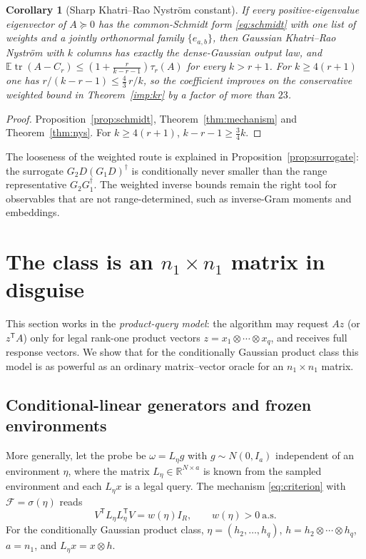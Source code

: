 \documentclass[11pt,a4paper]{article}
\newtheorem{corollary}[theorem]{Corollary}
\theoremstyle{definition}
\theoremstyle{remark}
\numberwithin{equation}{section}
\newcommand{\E}{\mathbb E}
\newcommand{\R}{\mathbb R}
\newcommand{\T}{{\mathsf T}}
\newcommand{\tr}{\operatorname{tr}}
\begin{document}
\begin{corollary}[Sharp Khatri--Rao Nystr\"om constant]\label{cor:kr}
If every positive-eigenvalue eigenvector of $A\succeq0$ has the common-Schmidt
form \eqref{eq:schmidt} with one list of weights and a jointly orthonormal
family $\{e_{a,b}\}$, then Gaussian Khatri--Rao Nystr\"om with $k$ columns has
exactly the dense-Gaussian output law, and
$\E\tr(A-C_r)\le(1+\frac r{k-r-1})\tau_r(A)$ for every $k>r+1$.
For $k\ge4(r+1)$ one has $r/(k-r-1)\le\frac43\,r/k$, so the coefficient
improves on the conservative weighted bound in Theorem~\ref{imp:kr} by a factor of more than $23$.
\end{corollary}

\begin{proof}
Proposition~\ref{prop:schmidt}, Theorem~\ref{thm:mechanism} and
Theorem~\ref{thm:nys}. For $k\ge4(r+1)$, $k-r-1\ge\frac34k$.
\end{proof}

The looseness of the weighted route is explained in
Proposition~\ref{prop:surrogate}: the surrogate $G_2D(G_1D)^\dagger$ is
conditionally never smaller than the range representative $G_2G_1^\dagger$.
The weighted inverse bounds remain the right tool for observables that are
not range-determined, such as inverse-Gram moments and embeddings.
\section{The class is an \texorpdfstring{$n_1\times n_1$}{n1 x n1} matrix in disguise}
\label{sec:reduction}

This section works in the \emph{product-query model}: the algorithm may
request $Az$ (or $z^\T A$) only for legal rank-one product vectors
$z=x_1\otimes\cdots\otimes x_q$, and receives full response vectors. We show
that for the conditionally Gaussian product class this model is as powerful as
an ordinary matrix--vector oracle for an $n_1\times n_1$ matrix.

\subsection{Conditional-linear generators and frozen environments}

More generally, let the probe be $\omega=L_\eta g$ with $g\sim N(0,I_a)$
independent of an environment $\eta$, where the matrix $L_\eta\in\R^{N\times a}$
is known from the sampled environment and each $L_\eta x$ is a legal query.
The mechanism \eqref{eq:criterion} with $\mathcal F=\sigma(\eta)$ reads
\begin{equation}\label{eq:CL}
 V^\T L_\eta L_\eta^\T V=w(\eta)I_R,\qquad w(\eta)>0\ \text{a.s.}
\end{equation}
For the conditionally Gaussian product class, $\eta=(h_2,\ldots,h_q)$,
$h=h_2\otimes\cdots\otimes h_q$, $a=n_1$, and $L_\eta x=x\otimes h$.
\end{document}
